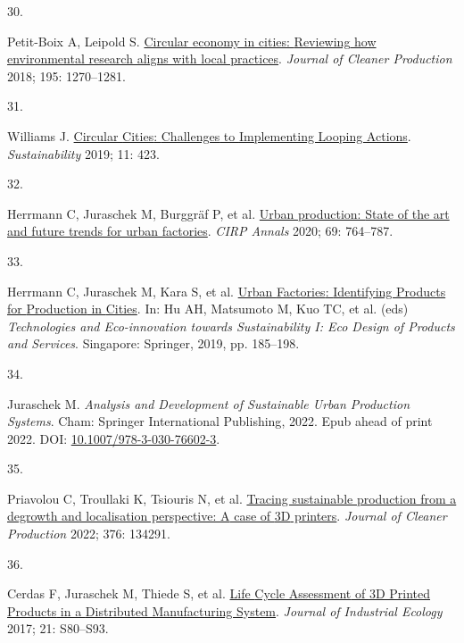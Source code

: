 \documentclass[
  12pt,
  a4paperpaper,
  onecolumn]{article}
\newlength{\cslhangindent}
\newlength{\csllabelwidth}
\newlength{\cslentryspacingunit} %
\newenvironment{CSLReferences}[2] %
 {%
  \setlength{\parindent}{0pt}
  \ifodd #1
  \let\oldpar\par
  \def\par{\hangindent=\cslhangindent\oldpar}
  \fi
  \setlength{\parskip}{#2\cslentryspacingunit}
 }%
 {}
\newcommand{\CSLLeftMargin}[1]{\parbox[t]{\csllabelwidth}{#1}}
\newcommand{\CSLRightInline}[1]{\parbox[t]{\linewidth - \csllabelwidth}{#1}\break}
\begin{document}
\begin{CSLReferences}{0}{0}
\leavevmode{}%
\CSLLeftMargin{30. }%
\CSLRightInline{Petit-Boix A, Leipold S.
\href{https://doi.org/10.1016/j.jclepro.2018.05.281}{Circular economy in
cities: {Reviewing} how environmental research aligns with local
practices}. \emph{Journal of Cleaner Production} 2018; 195: 1270--1281.}

\leavevmode{}%
\CSLLeftMargin{31. }%
\CSLRightInline{Williams J.
\href{https://doi.org/10.3390/su11020423}{Circular {Cities}:
{Challenges} to {Implementing Looping Actions}}. \emph{Sustainability}
2019; 11: 423.}

\leavevmode{}%
\CSLLeftMargin{32. }%
\CSLRightInline{Herrmann C, Juraschek M, Burggräf P, et al.
\href{https://doi.org/10.1016/j.cirp.2020.05.003}{Urban production:
{State} of the art and future trends for urban factories}. \emph{CIRP
Annals} 2020; 69: 764--787.}

\leavevmode{}%
\CSLLeftMargin{33. }%
\CSLRightInline{Herrmann C, Juraschek M, Kara S, et al.
\href{https://doi.org/10.1007/978-981-13-1181-9_15}{Urban {Factories}:
{Identifying Products} for {Production} in {Cities}}. In: Hu AH,
Matsumoto M, Kuo TC, et al. (eds) \emph{Technologies and
{Eco-innovation} towards {Sustainability I}: {Eco Design} of {Products}
and {Services}}. {Singapore}: {Springer}, 2019, pp. 185--198.}

\leavevmode{}%
\CSLLeftMargin{34. }%
\CSLRightInline{Juraschek M. \emph{Analysis and {Development} of
{Sustainable Urban Production Systems}}. {Cham}: {Springer International
Publishing}, 2022. Epub ahead of print 2022. DOI:
\href{https://doi.org/10.1007/978-3-030-76602-3}{10.1007/978-3-030-76602-3}.}

\leavevmode{}%
\CSLLeftMargin{35. }%
\CSLRightInline{Priavolou C, Troullaki K, Tsiouris N, et al.
\href{https://doi.org/10.1016/j.jclepro.2022.134291}{Tracing sustainable
production from a degrowth and localisation perspective: {A} case of
{3D} printers}. \emph{Journal of Cleaner Production} 2022; 376: 134291.}

\leavevmode{}%
\CSLLeftMargin{36. }%
\CSLRightInline{Cerdas F, Juraschek M, Thiede S, et al.
\href{https://doi.org/10.1111/jiec.12618}{Life {Cycle Assessment} of {3D
Printed Products} in a {Distributed Manufacturing System}}.
\emph{Journal of Industrial Ecology} 2017; 21: S80--S93.}


\end{CSLReferences}
\end{document}
